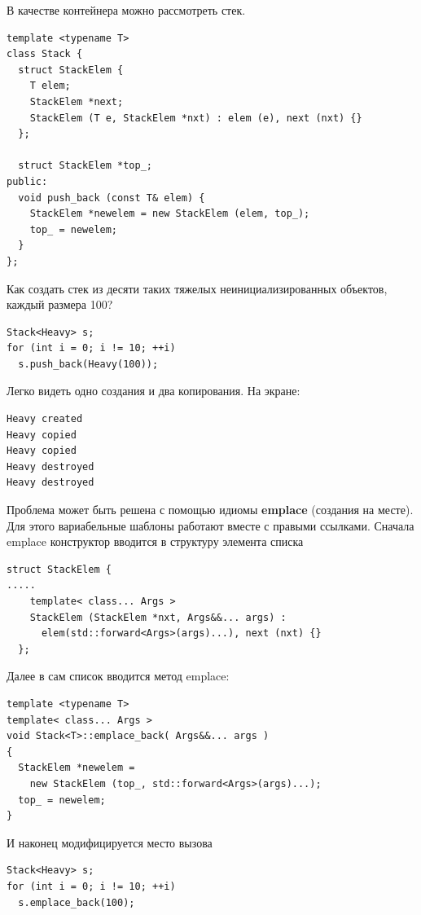 \documentclass[a4paper,12pt,oneside]{book}
\begin{document}
В качестве контейнера можно рассмотреть стек.

\begin{lstlisting}
template <typename T>
class Stack {
  struct StackElem {
    T elem;
    StackElem *next;
    StackElem (T e, StackElem *nxt) : elem (e), next (nxt) {}
  };

  struct StackElem *top_;
public:
  void push_back (const T& elem) {
    StackElem *newelem = new StackElem (elem, top_);
    top_ = newelem;
  }
};
\end{lstlisting}

Как создать стек из десяти таких тяжелых неинициализированных объектов, каждый размера 100?

\begin{lstlisting}
Stack<Heavy> s;
for (int i = 0; i != 10; ++i)
  s.push_back(Heavy(100));
\end{lstlisting}

Легко видеть одно создания и два копирования. На экране:

\begin{verbatim}
Heavy created
Heavy copied
Heavy copied
Heavy destroyed
Heavy destroyed
\end{verbatim}

Проблема может быть решена с помощью идиомы \textbf{emplace} (создания на месте). Для этого вариабельные шаблоны работают вместе с правыми ссылками. Сначала emplace конструктор вводится в структуру элемента списка

\begin{lstlisting}
struct StackElem {
.....
    template< class... Args >
    StackElem (StackElem *nxt, Args&&... args) : 
      elem(std::forward<Args>(args)...), next (nxt) {}
  };
\end{lstlisting}

Далее в сам список вводится метод emplace:

\begin{lstlisting}
template <typename T>
template< class... Args >
void Stack<T>::emplace_back( Args&&... args )
{
  StackElem *newelem = 
    new StackElem (top_, std::forward<Args>(args)...);
  top_ = newelem;
}
\end{lstlisting}

И наконец модифицируется место вызова

\begin{lstlisting}
Stack<Heavy> s;
for (int i = 0; i != 10; ++i)
  s.emplace_back(100);
\end{lstlisting}
\end{document}
